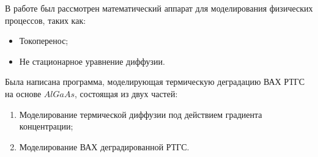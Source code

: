 \Conclusion
В работе был рассмотрен математический аппарат для моделирования физических процессов, таких как:
\begin{itemize}
	\item Токоперенос;
	\item Не стационарное уравнение диффузии.
\end{itemize}

Была написана программа, моделирующая термическую деградацию ВАХ РТГС на основе $AlGaAs$, состоящая из двух частей:
\begin{enumerate}
	\item Моделирование термической диффузии под действием градиента концентрации;
	\item Моделирование ВАХ деградированной РТГС.
\end{enumerate}